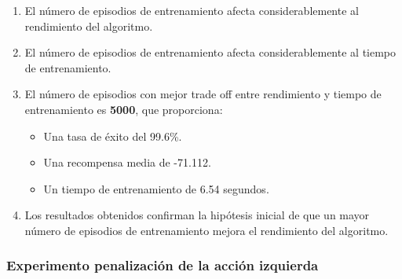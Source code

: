 \begin{enumerate}
    \item El número de episodios de entrenamiento afecta considerablemente al rendimiento del algoritmo.
    \item El número de episodios de entrenamiento afecta considerablemente al tiempo de entrenamiento.
    \item El número de episodios con mejor trade off entre rendimiento y tiempo de entrenamiento es \textbf{5000}, que proporciona:
    \begin{itemize}
        \item Una tasa de éxito del 99.6\%.
        \item Una recompensa media de -71.112.
        \item Un tiempo de entrenamiento de 6.54 segundos.
    \end{itemize}
    \item Los resultados obtenidos confirman la hipótesis inicial de que un mayor número de episodios de entrenamiento mejora el rendimiento del algoritmo.
\end{enumerate}

\newpage
\subsubsection{Experimento penalización de la acción izquierda}

